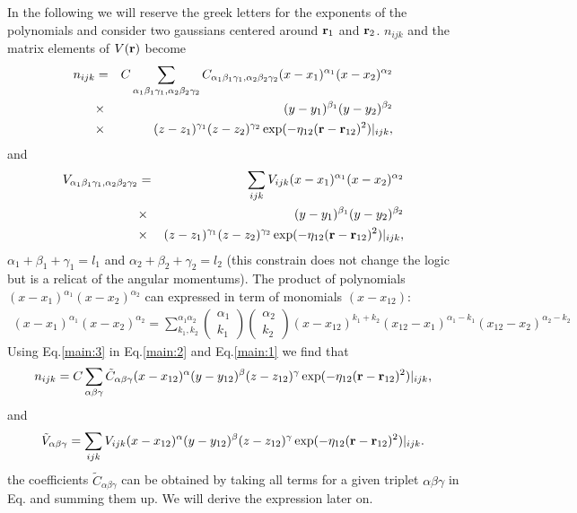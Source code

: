 \documentclass[prb]{revtex4}
\begin{document}
In the following we will reserve the greek letters for the exponents of the
polynomials and consider two gaussians centered around ${\bf r}_1$ and ${\bf
  r}_2$. $n_{ijk}$ and the matrix elements of $V({\bf r})$ become
\begin{eqnarray}
  \label{main:3}
  n_{ijk} &=& C \sum_{\alpha_1\beta_1\gamma_1, \alpha_2\beta_2\gamma_2} C_{\alpha_1\beta_1\gamma_1, \alpha_2\beta_2\gamma_2} (x-x_1)^{\alpha_1} (x-x_2)^{\alpha_2}\nonumber \\
  &\times&(y-y_1)^{\beta_1} (y-y_2)^{\beta_2}\nonumber \\
  &\times&(z - z_1)^{\gamma_1} (z-z_2)^{\gamma_2} \exp(-\eta_{12}({\bf r} - {\bf r}_{12})^2)| _{ijk},
\end{eqnarray}
and
\begin{eqnarray}
  \label{main:4}
  V_{\alpha_1\beta_1\gamma_1, \alpha_2\beta_2\gamma_2} &=& \sum_{ijk} V_{ijk} (x-x_1)^{\alpha_1} (x-x_2)^{\alpha_2}\nonumber \\
  &\times&(y-y_1)^{\beta_1} (y-y_2)^{\beta_2}\nonumber \\
  &\times&(z - z_1)^{\gamma_1} (z-z_2)^{\gamma_2} \exp(-\eta_{12}({\bf r} - {\bf r}_{12})^2)| _{ijk},
\end{eqnarray}
$\alpha_1 + \beta_1 + \gamma_1 = l_1$ and $\alpha_2 + \beta_2 + \gamma_2 = l_2$
(this constrain does not change the logic but is a relicat of the angular
momentums). The product of polynomials $(x-x_1)^{\alpha_1} (x-x_2)^{\alpha_2}$
can expressed in term of monomials $(x-x_{12})$:
\begin{eqnarray}
  \label{main:5}
  (x-x_1)^{\alpha_1} (x-x_2)^{\alpha_2} = \sum^{\alpha_1\alpha_2}_{k_1,k_2} \left(\begin{array}{c} \alpha_1\\ k_1\end{array}\right)\left(\begin{array}{c} \alpha_2\\ k_2\end{array}\right)(x - x_{12}) ^{k_1+k_2} (x_{12} - x_1)^{\alpha_1 - k_1}(x_{12} - x_2)^{\alpha_2 - k_2}
\end{eqnarray}
Using Eq.\ref{main:3} in Eq.\ref{main:2} and Eq.\ref{main:1} we find that
\begin{equation}
  \label{main:6}
  n_{ijk} = C \sum_{\alpha\beta\gamma} {\tilde C}_{\alpha\beta\gamma} (x-x_{12})^{\alpha} (y-y_{12})^{\beta} (z - z_{12})^{\gamma} \exp(-\eta_{12}({\bf r} - {\bf r}_{12})^2)| _{ijk},
\end{equation}
and
\begin{equation}
  \label{main:7}
        {\tilde V}_{\alpha\beta\gamma} = \sum_{ijk} V_{ijk} (x-x_{12})^{\alpha} (y-y_{12})^{\beta} (z - z_{12})^{\gamma} \exp(-\eta_{12}({\bf r} - {\bf r}_{12})^2)| _{ijk}.
\end{equation}
the coefficients ${\tilde C}_{\alpha\beta\gamma}$ can be obtained by taking all
terms for a given triplet $\alpha\beta\gamma$ in Eq.\label{main:3} and summing
them up. We will derive the expression later on.
\end{document}
